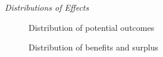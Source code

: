 \begin{frame}\begin{center}
		\LARGE\textit{Distributions of Effects}
\end{center}\end{frame}
\begin{frame}
	\begin{figure}\caption{Distribution of potential outcomes}
	\end{figure}
\end{frame}
\begin{frame}
	\begin{figure}\caption{Distribution of benefits and surplus}
	\end{figure}
\end{frame}
